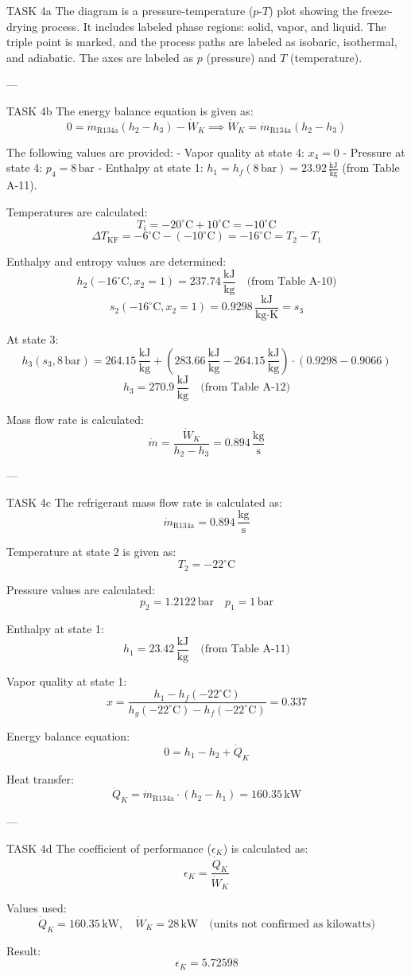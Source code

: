 TASK 4a  
The diagram is a pressure-temperature (\( p \)-\( T \)) plot showing the freeze-drying process. It includes labeled phase regions: solid, vapor, and liquid. The triple point is marked, and the process paths are labeled as isobaric, isothermal, and adiabatic. The axes are labeled as \( p \) (pressure) and \( T \) (temperature).

---

TASK 4b  
The energy balance equation is given as:  
\[
0 = \dot{m}_{\text{R134a}} (h_2 - h_3) - \dot{W}_K \implies \dot{W}_K = \dot{m}_{\text{R134a}} (h_2 - h_3)
\]

The following values are provided:  
- Vapor quality at state 4: \( x_4 = 0 \)  
- Pressure at state 4: \( p_4 = 8 \, \text{bar} \)  
- Enthalpy at state 1: \( h_1 = h_f(8 \, \text{bar}) = 23.92 \, \frac{\text{kJ}}{\text{kg}} \) (from Table A-11).  

Temperatures are calculated:  
\[
T_i = -20^\circ\text{C} + 10^\circ\text{C} = -10^\circ\text{C}
\]
\[
\Delta T_{\text{KF}} = -6^\circ\text{C} - (-10^\circ\text{C}) = -16^\circ\text{C} = T_2 - T_1
\]

Enthalpy and entropy values are determined:  
\[
h_2(-16^\circ\text{C}, x_2 = 1) = 237.74 \, \frac{\text{kJ}}{\text{kg}} \quad \text{(from Table A-10)}
\]
\[
s_2(-16^\circ\text{C}, x_2 = 1) = 0.9298 \, \frac{\text{kJ}}{\text{kg·K}} = s_3
\]

At state 3:  
\[
h_3(s_3, 8 \, \text{bar}) = 264.15 \, \frac{\text{kJ}}{\text{kg}} + (283.66 \, \frac{\text{kJ}}{\text{kg}} - 264.15 \, \frac{\text{kJ}}{\text{kg}}) \cdot (0.9298 - 0.9066)
\]
\[
h_3 = 270.9 \, \frac{\text{kJ}}{\text{kg}} \quad \text{(from Table A-12)}
\]

Mass flow rate is calculated:  
\[
\dot{m} = \frac{\dot{W}_K}{h_2 - h_3} = 0.894 \, \frac{\text{kg}}{\text{s}}
\]

---

TASK 4c  
The refrigerant mass flow rate is calculated as:  
\[
\dot{m}_{\text{R134a}} = 0.894 \, \frac{\text{kg}}{\text{s}}
\]

Temperature at state 2 is given as:  
\[
T_2 = -22^\circ\text{C}
\]

Pressure values are calculated:  
\[
p_2 = 1.2122 \, \text{bar} \quad p_1 = 1 \, \text{bar}
\]

Enthalpy at state 1:  
\[
h_1 = 23.42 \, \frac{\text{kJ}}{\text{kg}} \quad \text{(from Table A-11)}
\]

Vapor quality at state 1:  
\[
x = \frac{h_1 - h_f(-22^\circ\text{C})}{h_g(-22^\circ\text{C}) - h_f(-22^\circ\text{C})} = 0.337
\]

Energy balance equation:  
\[
0 = h_1 - h_2 + \dot{Q}_K
\]

Heat transfer:  
\[
\dot{Q}_K = \dot{m}_{\text{R134a}} \cdot (h_2 - h_1) = 160.35 \, \text{kW}
\]

---

TASK 4d  
The coefficient of performance (\( \epsilon_K \)) is calculated as:  
\[
\epsilon_K = \frac{\dot{Q}_K}{\dot{W}_K}
\]

Values used:  
\[
\dot{Q}_K = 160.35 \, \text{kW}, \quad \dot{W}_K = 28 \, \text{kW} \quad \text{(units not confirmed as kilowatts)}
\]

Result:  
\[
\epsilon_K = 5.72598
\]